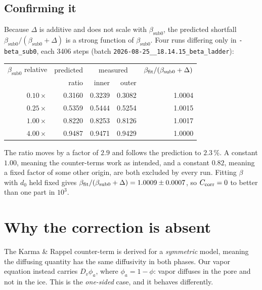 \documentclass[11pt,a4paper]{article}
\newcommand{\code}[1]{\texttt{\small #1}}
\newcommand{\bsub}{\beta_{\mathrm{sub0}}}
\begin{document}
\subsection{Confirming it}
Because $\Delta$ is additive and does not scale with $\bsub$, the predicted shortfall
$\bsub/(\bsub+\Delta)$ is a strong function of $\bsub$. Four runs differing only in
\code{-beta\_sub0}, each 3406 steps (batch \code{2026-08-25\_\_18.14.15\_beta\_ladder}):
\begin{center}\small\begin{tabular}{rrrrr}\toprule
$\bsub$ relative & predicted & \multicolumn{2}{c}{measured} & $\beta_{\rm fit}/(\bsub+\Delta)$\\
 & ratio & inner & outer & \\ \midrule
$0.10\times$ & 0.3160 & 0.3239 & 0.3082 & 1.0004\\
$0.25\times$ & 0.5359 & 0.5444 & 0.5254 & 1.0015\\
$1.00\times$ & 0.8220 & 0.8253 & 0.8126 & 1.0017\\
$4.00\times$ & 0.9487 & 0.9471 & 0.9429 & 1.0000\\ \bottomrule
\end{tabular}\end{center}
The ratio moves by a factor of $2.9$ and follows the prediction to $2.3\,\%$. A constant
$1.00$, meaning the counter-terms work as intended, and a constant $0.82$, meaning a fixed
factor of some other origin, are both excluded by every run. Fitting $\beta$ with $d_0$
held fixed gives $\beta_{\rm fit}/(\bsub+\Delta)=1.0009\pm0.0007$, so $C_{\rm corr}=0$ to
better than one part in $10^3$.

\section{Why the correction is absent}

The Karma \& Rappel counter-term is derived for a \emph{symmetric} model, meaning the
diffusing quantity has the same diffusivity in both phases. Our vapor equation instead
carries $D_v\phi_a$, where $\phi_a=1-\phi$: vapor diffuses in the pore and not in the ice.
This is the \emph{one-sided} case, and it behaves differently.
\end{document}
